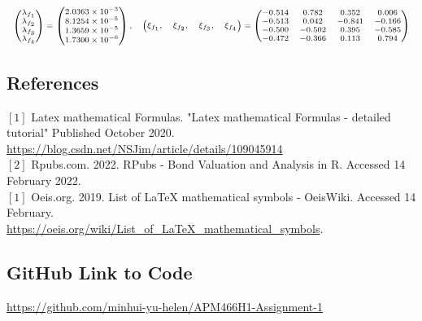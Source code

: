 \documentclass[10pt]{article}
\begin{document}
\begin{enumerate}
$$\begin{scriptsize}
            \begin{array}{ll}   
            \begin{pmatrix} 
            \lambda_{f_1} \\ 
            \lambda_{f_2} \\
            \lambda_{f_3} \\        
            \lambda_{f_4} 
            \end{pmatrix} = \begin{pmatrix}
            2.0363 \times 10^{-3}  \\
            8.1254 \times 10^{-5} \\
            1.3659 \times 10^{-5} \\
            1.7300 \times 10^{-6}
            \end{pmatrix}, \quad
            \begin{pmatrix} 
            \xi_{f_1}, & 
            \xi_{f_2}, &
            \xi_{f_3}, &       
            \xi_{f_4} 
            \end{pmatrix}= \begin{pmatrix}
            -0.514 & 0.782 & 0.352 & 0.006 \\
            -0.513 & 0.042 & -0.841 & -0.166 \\
            -0.500 & -0.502 & 0.395 & -0.585 \\
            -0.472 & -0.366 & 0.113 & 0.794
            \end{pmatrix}
            \end{array}
        \end{scriptsize}
        $$
        
\end{enumerate}

\subsection*{References}

$[1]$ Latex mathematical Formulas. "Latex mathematical Formulas - detailed tutorial" Published October 2020.\\
\href{https://blog.csdn.net/NSJim/article/details/109045914} {https://blog.csdn.net/NSJim/article/details/109045914} \\
$[2]$ Rpubs.com. 2022. RPubs - Bond Valuation and Analysis in R. Accessed 14 February 2022. \\  
$[1]$ Oeis.org. 2019. List of LaTeX mathematical symbols - OeisWiki. Accessed 14 February. \\ \href{https://oeis.org/wiki/List_of_LaTeX_mathematical_symbols_2022}{https://oeis.org/wiki/List_of_LaTeX_mathematical_symbols}.

\subsection*{GitHub Link to Code}

\href{https://github.com/minhui-yu-helen/APM466H1-Assignment-1}{https://github.com/minhui-yu-helen/APM466H1-Assignment-1}
\end{document}
